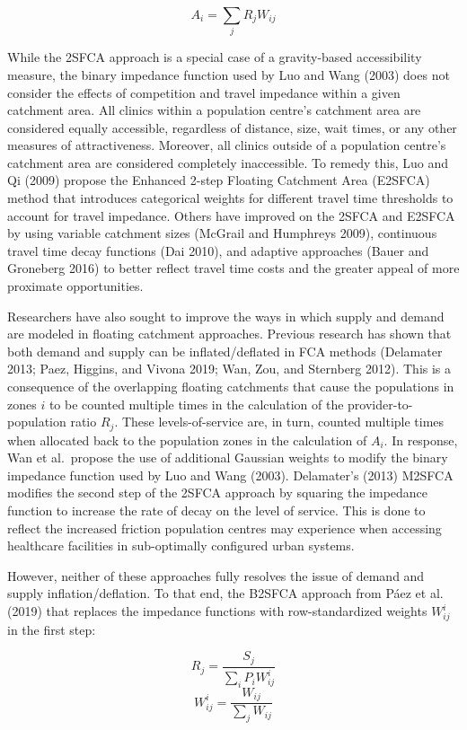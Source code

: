 \documentclass{article}
\begin{document}
\[
A_i = \sum_j{R_jW_{ij}}
\]

While the 2SFCA approach is a special case of a gravity-based
accessibility measure, the binary impedance function used by Luo and
Wang (2003) does not consider the effects of competition and travel
impedance within a given catchment area. All clinics within a population
centre's catchment area are considered equally accessible, regardless of
distance, size, wait times, or any other measures of attractiveness.
Moreover, all clinics outside of a population centre's catchment area
are considered completely inaccessible. To remedy this, Luo and Qi
(2009) propose the Enhanced 2-step Floating Catchment Area (E2SFCA)
method that introduces categorical weights for different travel time
thresholds to account for travel impedance. Others have improved on the
2SFCA and E2SFCA by using variable catchment sizes (McGrail and
Humphreys 2009), continuous travel time decay functions (Dai 2010), and
adaptive approaches (Bauer and Groneberg 2016) to better reflect travel
time costs and the greater appeal of more proximate opportunities.

Researchers have also sought to improve the ways in which supply and
demand are modeled in floating catchment approaches. Previous research
has shown that both demand and supply can be inflated/deflated in FCA
methods (Delamater 2013; Paez, Higgins, and Vivona 2019; Wan, Zou, and
Sternberg 2012). This is a consequence of the overlapping floating
catchments that cause the populations in zones \(i\) to be counted
multiple times in the calculation of the provider-to-population ratio
\(R_j\). These levels-of-service are, in turn, counted multiple times
when allocated back to the population zones in the calculation of
\(A_i\). In response, Wan et al.~propose the use of additional Gaussian
weights to modify the binary impedance function used by Luo and Wang
(2003). Delamater's (2013) M2SFCA modifies the second step of the 2SFCA
approach by squaring the impedance function to increase the rate of
decay on the level of service. This is done to reflect the increased
friction population centres may experience when accessing healthcare
facilities in sub-optimally configured urban systems.

However, neither of these approaches fully resolves the issue of demand
and supply inflation/deflation. To that end, the B2SFCA approach from
Páez et al. (2019) that replaces the impedance functions with
row-standardized weights \(W_{ij}^{i}\) in the first step:

\[
R_j = \frac{S_j}{\sum_i{P_iW_{ij}^{i}}}
\] \[
W_{ij}^{i} = \frac{W_{ij}}{\sum_j W_{ij}}
\]
\end{document}
